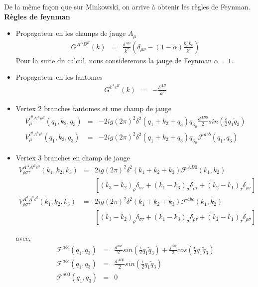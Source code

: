 \documentclass[a4paper,11pt]{article}
\theoremstyle{plain}
\theoremstyle{definition}
\theoremstyle{remark}
\numberwithin{equation}{section}
\numberwithin{equation}{subsection}
\numberwithin{figure}{section}
\begin{document}
\noindent
De la même façon que sur Minkowski, on arrive à obtenir les règles de Feynman.\\
\textbf{Règles de feynman}\\

\begin{itemize}
 \renewcommand{\labelitemi}{$\bullet$}

 \item Propagateur en les champs de jauge $A_{\mu}$
\begin{eqnarray}
 G^{ A^{A} B^{B} } (k)  &=&  \frac{ \delta^{AB} }{ k^2 } \left(  \delta_{\mu \nu}  - (1-\alpha)  \frac{ k_{\mu} k_{\nu} }{ k^2 } \right) 
\end{eqnarray}
Pour la suite du calcul, nous considererons la jauge de Feynman  $\alpha=1$.
\item Propagateur en les fantomes
\begin{eqnarray}
 G^{ \overline{c}^{A} c^{B} } (k)  &=& - \frac{ \delta^{AB} }{ k^2 } 
\end{eqnarray}

\item Vertex 2 branches fantomes et une champ de jauge
\begin{eqnarray}
 V_{\mu}^{ \overline{c}^{0} A^{A} c^{B} } (q_1 , k_2 , q_3 ) &=& -2ig (2 \pi)^2 \delta^{2} ( q_1 +k_2 +q_3 ) q_{3_{\mu}} \frac{d^{AB0}}{2} 
sin( \frac{\epsilon}{2}  q_1 \tilde{q}_3 ) \\
 V_{\mu}^{ \overline{c}^{a} A^{b} c^{c} } (q_1 , k_2 , q_3 ) &=& -2ig (2 \pi)^2 \delta^{2} ( q_1 +k_2 +q_3 ) q_{3_{\mu}} \mathcal{F}^{acb}(q_1 , q_3)
\end{eqnarray}

\item Vertex 3 branches en champ de jauge
\begin{eqnarray*}
 V_{\rho  \sigma  \tau}^{ A^{A} A^{B} c^{0} } (k_1 , k_2 , k_3 ) &=&  2ig (2 \pi)^2 \delta^{2} ( k_1 + k_2 + k_3 )  \mathcal{F}^{AB0}(k_1 , k_2) \\
&&   \left[
(k_3  -  k_2)_{\rho}  \delta_{\sigma  \tau}  +  (k_1  -  k_3)_{\sigma}  \delta_{\rho  \tau}  +  (k_2  -  k_1)_{\tau}  \delta_{\rho  \sigma }
\right]      \\
  V_{\rho  \sigma  \tau}^{A^{a} A^{b} c^{d} } (k_1 , k_2 , k_3 ) &=& 2ig (2 \pi)^2 \delta^{2} ( k_1 + k_2 + k_3 )  \mathcal{F}^{abc}(k_1 , k_2)  \\
&&   \left[
(k_3  -  k_2)_{\rho}  \delta_{\sigma  \tau}  +  (k_1  -  k_3)_{\sigma}  \delta_{\rho  \tau}  +  (k_2  -  k_1)_{\tau}  \delta_{\rho  \sigma }
\right]
\end{eqnarray*}

avec,
\begin{eqnarray}
 \mathcal{F}^{abc}(q_1 , q_3)  &=&  \frac{d^{abc}}{2}   sin \left(  \frac{\epsilon}{2}  q_1  \tilde{q}_3  \right)   +    \frac{f^{abc}}{2}   cos \left(  \frac{\epsilon}{2}  q_1  \tilde{q}_3   \right)   \\
 \mathcal{F}^{abc}(q_1 , q_3)  &=&  \frac{d^{AB0}}{2}   sin \left(  \frac{\epsilon}{2}  q_1  \tilde{q}_3  \right)  \\
 \mathcal{F}^{a00}(q_1 , q_3)  &=& 0
\end{eqnarray}

\end{itemize}
\end{document}
